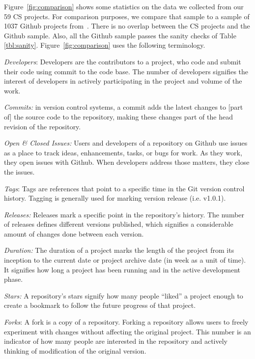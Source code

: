 \documentclass[sigconf,review,anonymous]{acmart}
\begin{document}
Figure~\ref{fig:comparison} shows some statistics on the data we collected from our 59 CS projects. For comparison purposes, we compare that sample to 
a sample of 1037 Github projects from~\cite{Majumder19}.
There is no overlap between the CS projects and the Github sample. Also, all the Github
sample passes the sanity checks of Table \ref{tbl:sanity}. Figure~\ref{fig:comparison} uses the following terminology.

\textit{Developers}: Developers are the contributors to a project, who code and submit their code using commit to the code base. The number of developers signifies the interest of developers in actively participating in the project and volume of the work.
  
  
\textit{Commits:} in version control systems, a commit adds the latest changes to [part of] the source code to the repository, making these changes part of the head revision of the repository. 

\textit{Open \& Closed Issues:} Users and developers of a repository on Github use issues as a place to track ideas, enhancements, tasks, or bugs for work. As they work, they open issues with Github. When developers address those matters, they close the issues.

\textit{Tags}: Tags are references that point to a specific time in the Git version control history. Tagging is generally used for marking version release (i.e. v1.0.1).


\textit{Releases:} Releases mark a specific point in the repository’s history. The number of releases defines different versions published, which signifies a considerable amount of changes done between each version.

\textit{Duration:} The duration of a project marks the length of the project from its inception to the current date or project archive date (in week as a unit of time). It signifies how long a project has been running and in the active development phase.





\textit{Stars:} A repository's stars signify how many people
  ``liked'' a project enough to create a bookmark to follow the future progress of that project.
  
   \textit{Forks}: A fork is a copy of a repository. Forking a repository allows users to freely experiment with changes without affecting the original project. This number
  is an indicator of how many people are interested in the repository and actively thinking
  of modification of the original version.
  
\end{document}
